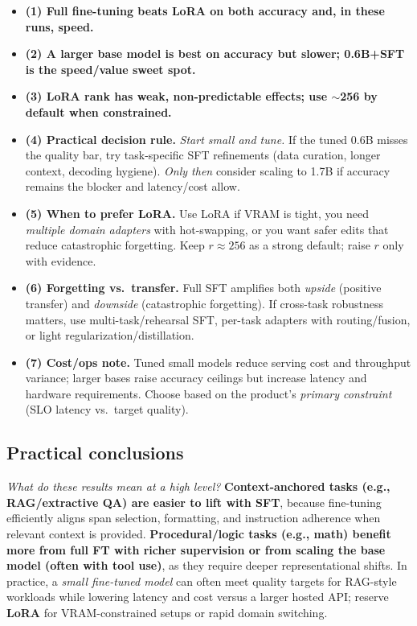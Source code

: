 \documentclass[11pt,a4paper]{article}
\begin{document}
\begin{itemize}
  \item \textbf{(1) Full fine-tuning beats LoRA on both accuracy and, in these runs, speed.}
  
  \item \textbf{(2) A larger base model is best on accuracy but slower; 0.6B+SFT is the speed/value sweet spot.}
  
  \item \textbf{(3) LoRA rank has weak, non-predictable effects; use $\sim$256 by default when constrained.}

  \item \textbf{(4) Practical decision rule.} \emph{Start small and tune.} If the tuned 0.6B misses the quality bar, try task-specific SFT refinements (data curation, longer context, decoding hygiene). \emph{Only then} consider scaling to 1.7B if accuracy remains the blocker and latency/cost allow.

  \item \textbf{(5) When to prefer LoRA.} Use LoRA if VRAM is tight, you need \emph{multiple domain adapters} with hot-swapping, or you want safer edits that reduce catastrophic forgetting. Keep $r\!\approx\!256$ as a strong default; raise $r$ only with evidence.

  \item \textbf{(6) Forgetting vs.\ transfer.} Full SFT amplifies both \emph{upside} (positive transfer) and \emph{downside} (catastrophic forgetting). If cross-task robustness matters, use multi-task/rehearsal SFT, per-task adapters with routing/fusion, or light regularization/distillation.

  \item \textbf{(7) Cost/ops note.} Tuned small models reduce serving cost and throughput variance; larger bases raise accuracy ceilings but increase latency and hardware requirements. Choose based on the product’s \emph{primary constraint} (SLO latency vs.\ target quality).
\end{itemize}

\subsection*{Practical conclusions}
\textit{What do these results mean at a high level?} \textbf{Context-anchored tasks (e.g., RAG/extractive QA) are easier to lift with SFT}, because fine-tuning efficiently aligns span selection, formatting, and instruction adherence when relevant context is provided. \textbf{Procedural/logic tasks (e.g., math) benefit more from full FT with richer supervision or from scaling the base model (often with tool use)}, as they require deeper representational shifts. In practice, a \emph{small fine-tuned model} can often meet quality targets for RAG-style workloads while lowering latency and cost versus a larger hosted API; reserve \textbf{LoRA} for VRAM-constrained setups or rapid domain switching.
\end{document}
